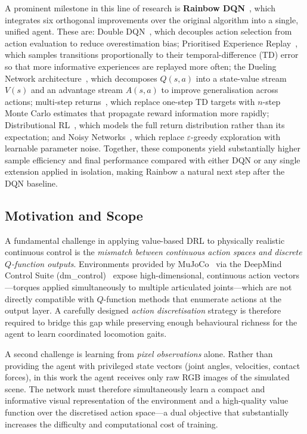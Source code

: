 A prominent milestone in this line of research is \textbf{Rainbow
DQN}~\citep{hessel2018rainbow}, which integrates six orthogonal improvements
over the original algorithm into a single, unified agent. These are:
Double DQN~\citep{van2016deep}, which decouples action selection from action
evaluation to reduce overestimation bias;
Prioritised Experience Replay~\citep{schaul2016prioritized}, which samples
transitions proportionally to their temporal-difference (TD) error so that
more informative experiences are replayed more often;
the Dueling Network architecture~\citep{wang2016dueling}, which decomposes
$Q(s,a)$ into a state-value stream $V(s)$ and an advantage stream $A(s,a)$
to improve generalisation across actions;
multi-step returns~\citep{sutton2018reinforcement}, which replace one-step
TD targets with $n$-step Monte Carlo estimates that propagate reward
information more rapidly;
Distributional RL~\citep{bellemare2017distributional}, which models the full
return distribution rather than its expectation; and
Noisy Networks~\citep{fortunato2018noisy}, which replace $\varepsilon$-greedy
exploration with learnable parameter noise.
Together, these components yield substantially higher sample efficiency and
final performance compared with either DQN or any single extension applied
in isolation, making Rainbow a natural next step after the DQN baseline.

\subsection{Motivation and Scope}

A fundamental challenge in applying value-based DRL to physically realistic
continuous control is the \emph{mismatch between continuous action spaces and
discrete $Q$-function outputs}. Environments provided by
MuJoCo~\citep{todorov2012mujoco} via the DeepMind Control
Suite (dm\_control)~\citep{tunyasuvunakool2020dmcontrol} expose
high-dimensional, continuous action vectors—torques applied simultaneously to
multiple articulated joints—which are not directly compatible with
$Q$-function methods that enumerate actions at the output layer.
A carefully designed \emph{action discretisation} strategy is therefore
required to bridge this gap while preserving enough behavioural richness for
the agent to learn coordinated locomotion gaits.

A second challenge is learning from \emph{pixel observations} alone.
Rather than providing the agent with privileged state vectors
(joint angles, velocities, contact forces), in this work the agent receives
only raw RGB images of the simulated scene. The network must therefore
simultaneously learn a compact and informative visual representation of the
environment and a high-quality value function over the discretised action
space—a dual objective that substantially increases the difficulty and
computational cost of training.

